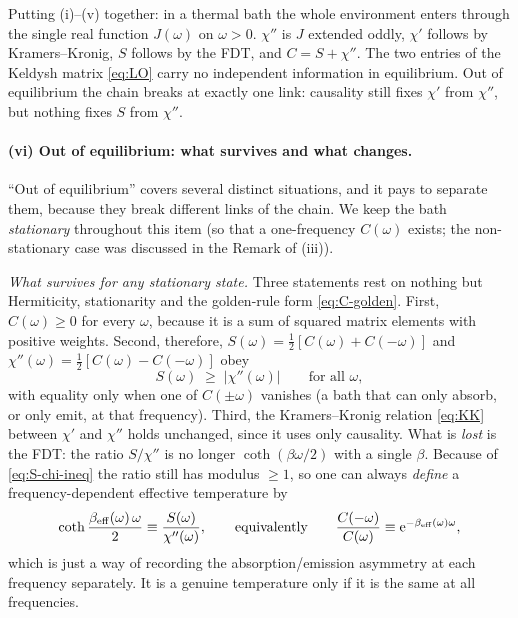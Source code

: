 Putting (i)--(v) together: in a thermal bath the whole environment enters through the single real function $J(\omega)$ on $\omega>0$.
$\chi''$ is $J$ extended oddly, $\chi'$ follows by Kramers--Kronig, $S$ follows by the FDT, and $C=S+\chi''$.
The two entries of the Keldysh matrix \eqref{eq:LO} carry no independent information in equilibrium.
Out of equilibrium the chain breaks at exactly one link: causality still fixes $\chi'$ from $\chi''$, but nothing fixes $S$ from $\chi''$.

\paragraph{(vi) Out of equilibrium: what survives and what changes.}
``Out of equilibrium'' covers several distinct situations, and it pays to separate them, because they break different links of the chain.
We keep the bath \emph{stationary} throughout this item (so that a one-frequency $C(\omega)$ exists; the non-stationary case was discussed in the Remark of (iii)).

\emph{What survives for any stationary state.}
Three statements rest on nothing but Hermiticity, stationarity and the golden-rule form \eqref{eq:C-golden}.
First, $C(\omega)\ge0$ for every $\omega$, because it is a sum of squared matrix elements with positive weights.
Second, therefore, $S(\omega)=\tfrac12[C(\omega)+C(-\omega)]$ and $\chi''(\omega)=\tfrac12[C(\omega)-C(-\omega)]$ obey
\begin{equation}
  S(\omega)\;\ge\;|\chi''(\omega)|\qquad\text{for all }\omega ,
  \label{eq:S-chi-ineq}
\end{equation}
with equality only when one of $C(\pm\omega)$ vanishes (a bath that can only absorb, or only emit, at that frequency).
Third, the Kramers--Kronig relation \eqref{eq:KK} between $\chi'$ and $\chi''$ holds unchanged, since it uses only causality.
What is \emph{lost} is the FDT: the ratio $S/\chi''$ is no longer $\coth(\beta\omega/2)$ with a single $\beta$.
Because of \cref{eq:S-chi-ineq} the ratio still has modulus $\ge1$, so one can always \emph{define} a frequency-dependent effective temperature by
\begin{equation}
  \coth\frac{\beta_{\rm eff}(\omega)\,\omega}{2}\equiv\frac{S(\omega)}{\chi''(\omega)},\qquad\text{equivalently}\qquad
  \frac{C(-\omega)}{C(\omega)}\equiv\mathrm{e}^{-\beta_{\rm eff}(\omega)\omega},
  \label{eq:Teff}
\end{equation}
which is just a way of recording the absorption/emission asymmetry at each frequency separately.
It is a genuine temperature only if it is the same at all frequencies.

